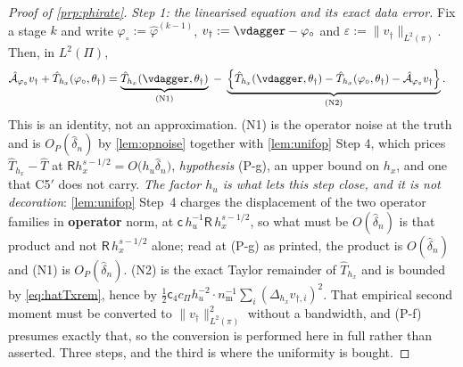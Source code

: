 \begin{proof}[Proof of \cref{prp:phirate}]
\emph{Step 1: the linearised equation and its exact data error.} Fix a stage $k$ and write
$\varphi_\circ:=\hat\varphi^{(k-1)}$, $v_\dagger:=\vdagger-\varphi_\circ$ and
$\varepsilon:=\|v_\dagger\|_{L^{2}(\pi)}$. Then, in $L^{2}(\Pi)$,
\begin{align}
\hat{\mathcal A}_{\varphi_\circ}v_\dagger+\hat T_{h_x}(\varphi_\circ,\theta_\dagger)
&=\underbrace{\hat T_{h_x}(\vdagger,\theta_\dagger)}_{\text{(N1)}}
\;-\;\underbrace{\Big\{\hat T_{h_x}(\vdagger,\theta_\dagger)-\hat T_{h_x}(\varphi_\circ,\theta_\dagger)-\hat{\mathcal A}_{\varphi_\circ}v_\dagger\Big\}}_{\text{(N2)}} .
\label{eq:stagedecomp}
\end{align}
This is an identity, not an approximation. (N1) is the operator noise at the truth and is
$O_P(\hat\delta_n)$ by \cref{lem:opnoise} together with \cref{lem:unifop} Step 4, which prices
$\hat T_{h_x}-\hat T$ at $\mathsf Rh_x^{s-1/2}=O\big(h_u\hat\delta_n\big)$, \emph{hypothesis} (P-g),
an upper bound on $h_x$, and one that C5$'$ does not carry. \emph{The factor $h_u$ is what lets this
step close, and it is not decoration}: \cref{lem:unifop} Step~4 charges the displacement of the two
operator families in \textbf{operator} norm, at $\mathsf c\,h_u^{-1}\mathsf R\,h_x^{s-1/2}$, so what
must be $O(\hat\delta_n)$ is that product and not $\mathsf R\,h_x^{s-1/2}$ alone; read at (P-g) as
printed, the product is $O(\hat\delta_n)$ and (N1) is $O_P(\hat\delta_n)$.
(N2) is the exact Taylor remainder of
$\hat T_{h_x}$ and is bounded by \eqref{eq:hatTxrem}, hence by
$\tfrac12\mathsf c_4c_\Pi h_u^{-2}\cdot n_{\mathrm m}^{-1}\sum_{i}(\Delta_{h_x}v_{\dagger,i})^{2}$.
That empirical second moment must be converted to $\|v_\dagger\|^{2}_{L^{2}(\pi)}$ without a
bandwidth, and (P-f) presumes exactly that, so the conversion is performed here in full rather than
asserted. Three steps, and the third is where the uniformity is bought.


\end{proof}

